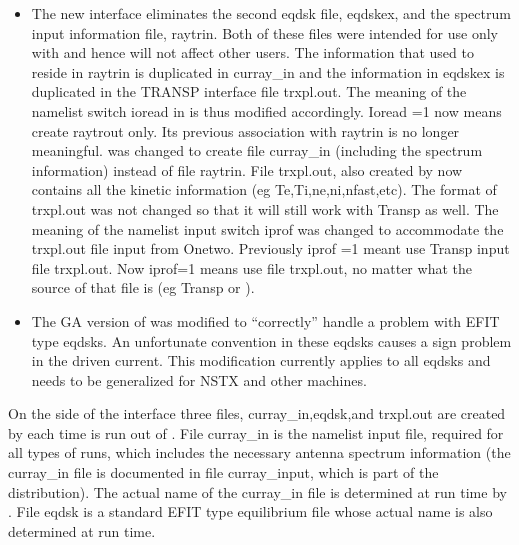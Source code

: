 \begin {itemize}
divided by the fast ion density. This feature is available only by
creating the \ct input files using the \ot code. An option in \ot
will collapse all the fast ion components into one effective component
thereby recovering the more usual mode of operation of \ct.
 \item The new \ot interface eliminates the second eqdsk file,
 eqdskex, and the spectrum input information file, raytrin.
 Both of these files were intended for use only with \ot and hence
 will not affect other users. The information that used to reside in
raytrin is duplicated in curray\_in 
 and the information in eqdskex is duplicated in the TRANSP
 interface file trxpl.out. The meaning of the namelist switch ioread
in \ct  is thus modified accordingly. Ioread =1 now means create
raytrout only. Its previous association with raytrin is no longer
meaningful. \ot  was changed to
 create file curray\_in (including the spectrum information) instead of
file raytrin. File trxpl.out, also created by \ot now contains all the
kinetic information (eg Te,Ti,ne,ni,nfast,etc). The format of
trxpl.out was not  changed so that it will still work with Transp as
well. The meaning of the \ct namelist input switch iprof was
changed to accommodate the trxpl.out file input from Onetwo.
Previously iprof =1 meant use Transp input file trxpl.out. Now iprof=1
means use file trxpl.out, no matter what the source of that file is
(eg Transp or \ot).
\item The GA version of \ct was modified to ``correctly'' handle a
  problem with EFIT type eqdsks. An unfortunate convention in these
  eqdsks causes a sign problem in the driven current. This modification
  currently applies to all eqdsks and needs to be generalized for
  NSTX and other machines.
\end{itemize}

 On the \ot side of the interface three files, curray\_in,eqdsk,and
 trxpl.out   are created by \ot each time \ct is run out of \ot. 
   File curray\_in is the namelist input
 file, required for all types of \ct runs,
 which includes the necessary antenna spectrum information (the
 curray\_in file is documented in file curray\_input, which is part of
 the \ct distribution). The actual
 name of the curray\_in file is determined at run time by \ot. 
 File eqdsk is a standard
 EFIT type equilibrium file whose actual name is also determined  at run
 time.

